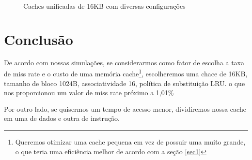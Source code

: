 \documentclass[12pt,a4paper]{article}
\begin{document}
\begin{figure}[h!]
\caption{Caches unificadas de 16KB com diversas configurações}
\end{figure}


\section{Conclusão}
De acordo com nossas simulações, se considerarmos como fator de
escolha a taxa de miss rate e o custo de uma memória
cache\footnote{Queremos otimizar uma cache pequena em vez de possuir
  uma muito grande, o que teria uma eficiência melhor de acordo com a
seção \ref{sec1}}, escolheremos uma chace de 16KB, tamanho
de bloco 1024B, associatividade 16, política de substituição LRU.
o que nos proporcionou um valor de miss rate próximo a 1,01\%

Por outro lado, se quisermos um tempo de acesso menor, dividiremos nossa cache
em uma de dados e outra de instrução.


\begin{small}
  
\end{small}
\end{document}
